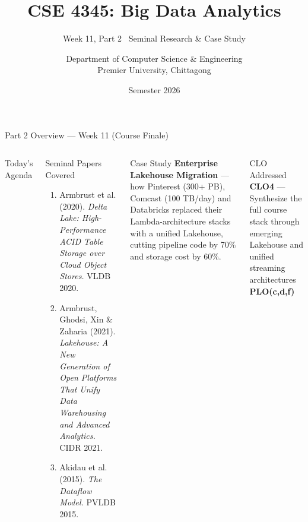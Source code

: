 \documentclass[aspectratio=169,10pt]{beamer}
\title[CSE 4345 \textbar{} Week 11, Part 2]{CSE 4345: Big Data Analytics}
\subtitle{Week 11, Part 2 \textemdash\ Seminal Research \& Case Study}
\author[Dept.\ of CSE]{Department of Computer Science \& Engineering\\[4pt]
       \small Premier University, Chittagong}
\institute{}
\date{Semester 2026}
\begin{document}

\begin{frame}
  \titlepage
\end{frame}

\begin{frame}{Part 2 Overview — Week 11 (Course Finale)}
  \begin{columns}[T]
      \begin{block}{Today's Agenda}
        \tableofcontents
      \end{block}
      \begin{exampleblock}{Seminal Papers Covered}
        \begin{enumerate}
          \item Armbrust et al. (2020).
                \textit{Delta Lake: High-Performance ACID Table
                Storage over Cloud Object Stores.} VLDB 2020.
          \item Armbrust, Ghodsi, Xin \& Zaharia (2021).
                \textit{Lakehouse: A New Generation of Open Platforms
                That Unify Data Warehousing and Advanced Analytics.}
                CIDR 2021.
          \item Akidau et al. (2015).
                \textit{The Dataflow Model.} PVLDB 2015.
        \end{enumerate}
      \end{exampleblock}
      \vspace{5pt}
      \begin{alertblock}{Case Study}
        \textbf{Enterprise Lakehouse Migration} — how Pinterest
        (300+ PB), Comcast (100 TB/day) and Databricks replaced
        their Lambda-architecture stacks with a unified Lakehouse,
        cutting pipeline code by 70\% and storage cost by 60\%.
      \end{alertblock}
      \vspace{4pt}
      \begin{block}{CLO Addressed}
        \textbf{CLO4} — Synthesize the full course stack through
        emerging Lakehouse and unified streaming architectures\\
        \textbf{PLO(c,d,f)}
      \end{block}
  \end{columns}
\end{frame}

\end{document}
